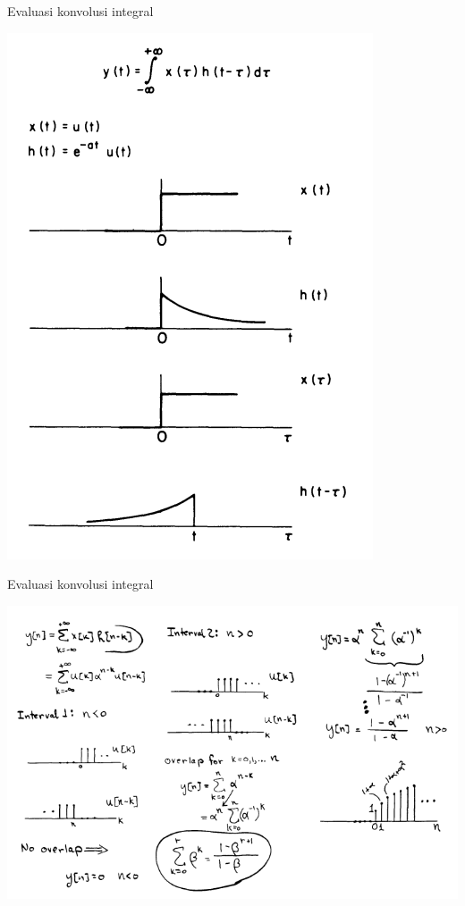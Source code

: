 \documentclass[aspectratio=169]{beamer}
\begin{document}
\begin{frame}{Evaluasi konvolusi integral}
	\begin{center}
		\includegraphics[height=0.8\textheight]{gambar/03.konvolusi/fig.4.10}
	\end{center}
\end{frame}

\begin{frame}{Evaluasi konvolusi integral}
	\begin{center}
		\includegraphics[height=0.8\textheight]{gambar/03.konvolusi/mk.4.02}
	\end{center}
\end{frame}
\end{document}
